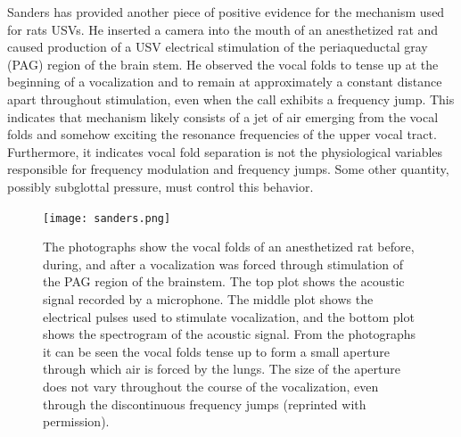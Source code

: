 \documentclass[12pt, letter]{report}
\begin{document}
Sanders has provided another piece of positive evidence for the mechanism used for rats USVs. He inserted a camera into the mouth of an anesthetized rat and caused production of a USV electrical stimulation of the periaqueductal gray (PAG) region of the brain stem. He observed the vocal folds to tense up at the beginning of a vocalization and to remain at approximately a constant distance apart throughout stimulation, even when the call exhibits a frequency jump. This indicates that mechanism likely consists of a jet of air emerging from the vocal folds and somehow exciting the resonance frequencies of the upper vocal tract. Furthermore, it indicates vocal fold separation is not the physiological variables responsible for frequency modulation and frequency jumps. Some other quantity, possibly subglottal pressure, must control this behavior. 
\begin{figure}
\centering
\texttt{[image: sanders.png]}
\caption{The photographs show the vocal folds of an anesthetized rat before, during, and after a vocalization was forced through stimulation of the PAG region of the brainstem. The top plot shows the acoustic signal recorded by a microphone. The middle plot shows the electrical pulses used to stimulate vocalization, and the bottom plot shows the spectrogram of the acoustic signal. From the photographs it can be seen the vocal folds tense up to form a small aperture through which air is forced by the lungs. The size of the aperture does not vary throughout the course of the vocalization, even through the discontinuous frequency jumps (reprinted with permission).}
\end{figure}




\end{document}

